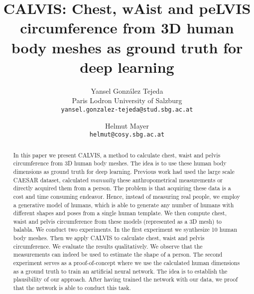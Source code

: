 \documentclass[10pt,twocolumn,letterpaper]{article}
\begin{document}
\title{CALVIS: Chest, wAist and peLVIS circumference from 3D human body meshes 
as ground truth for deep learning}

\author{Yansel González Tejeda\\
Paris Lodron University of Salzburg\\
{\tt\small yansel.gonzalez-tejeda@stud.sbg.ac.at}
\and
Helmut Mayer\\
{\tt\small helmut@cosy.sbg.ac.at}
}

\maketitle
\ificcvfinal\thispagestyle{empty}\fi

\begin{abstract}
   In this paper we present CALVIS, a method to calculate chest, waist and 
   pelvis circumference from 3D human body meshes. The idea is to use these 
   human body dimensions as ground truth for deep learning. Previous work had 
   used the large scale CAESAR dataset, calculated $\textit{manually}$ these 
   anthropometrical measurements or directly acquired them from a person. The 
   problem is that acquiring these data is a cost and time consuming endeavor. 
   Hence, instead of measuring real people, we employ a generative model of 
   humans, which is able to generate any number of humans with different shapes 
   and poses from a single human template. We then compute chest, waist and 
   pelvis circumference from these models (represented as a 3D mesh) to 
   balabla. We conduct two experiments. In the first experiment we synthesize 
   10 human body meshes. Then we apply CALVIS to calculate chest, waist and 
   pelvis circumference. We evaluate the results qualitatively. We observe that 
   the measurements can indeed be used to estimate the shape of a person. The 
   second experiment serves as a proof-of-concept where we use the calculated 
   human dimensions as a ground truth to train an artificial neural network. 
   The idea is to establish the plausibility of our approach. After having 
   trained the network with our 
   data, we proof that the network is able to conduct this task.
\end{abstract}
\end{document}
